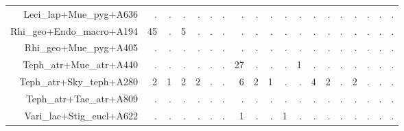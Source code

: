 \documentclass[a4paper, 11]{article}\usepackage[]{graphicx}\usepackage[]{color}
\begin{document}
\begin{table}
\begin{tabular}{rrrrrrrrrrrrrrrrrrr}
  Leci\_lap+Mue\_pyg+A636 & . & . & . & . & . & . & . & . & . & . & . & . & . & . & . & . & . & . \\ 
  Rhi\_geo+Endo\_macro+A194 & 45 & . & 5 & . & . & . & . & . & . & . & . & . & . & . & . & . & . & . \\ 
  Rhi\_geo+Mue\_pyg+A405 & . & . & . & . & . & . & . & . & . & . & . & . & . & . & . & . & . & . \\ 
  Teph\_atr+Mue\_atr+A440 & . & . & . & . & . & . & 27 & . & . & . & 1 & . & . & . & . & . & . & . \\ 
  Teph\_atr+Sky\_teph+A280 & 2 & 1 & 2 & 2 & . & . & 6 & 2 & 1 & . & . & 4 & 2 & . & 2 & . & . & . \\ 
  Teph\_atr+Tae\_atr+A809 & . & . & . & . & . & . & . & . & . & . & . & . & . & . & . & . & . & . \\ 
  Vari\_lac+Stig\_eucl+A622 & . & . & . & . & . & . & 1 & . & . & 1 & . & . & . & . & . & . & . & . \\ 
   \hline
\end{tabular}
\end{table}
\end{document}
